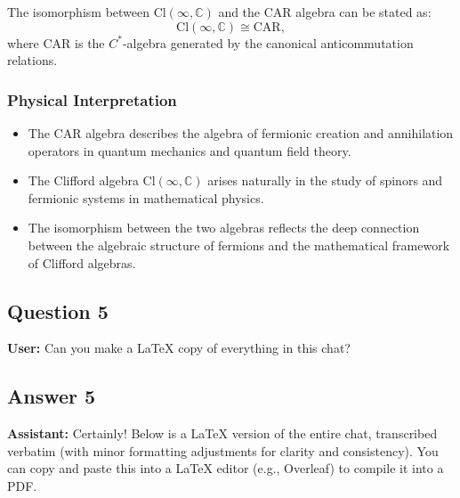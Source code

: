 \documentclass{article}
\begin{document}
The isomorphism between $\text{Cl}(\infty, \mathbb{C})$ and the CAR algebra
can be stated as: 
\begin{equation*}
\text{Cl}(\infty, \mathbb{C}) \cong \text{CAR}, 
\end{equation*}
where $\text{CAR}$ is the $C^*$-algebra generated by the canonical
anticommutation relations.

\subsubsection{Physical Interpretation}

\begin{itemize}
\item The CAR algebra describes the algebra of fermionic creation and
annihilation operators in quantum mechanics and quantum field theory. 

\item The Clifford algebra $\text{Cl}(\infty, \mathbb{C})$ arises naturally
in the study of spinors and fermionic systems in mathematical physics. 

\item The isomorphism between the two algebras reflects the deep connection
between the algebraic structure of fermions and the mathematical framework
of Clifford algebras.
\end{itemize}

\subsection{Question 5}

\textbf{User:} Can you make a LaTeX copy of everything in this chat?

\subsection{Answer 5}

\textbf{Assistant:} Certainly! Below is a LaTeX version of the entire chat,
transcribed verbatim (with minor formatting adjustments for clarity and
consistency). You can copy and paste this into a LaTeX editor (e.g.,
Overleaf) to compile it into a PDF.
\end{document}
